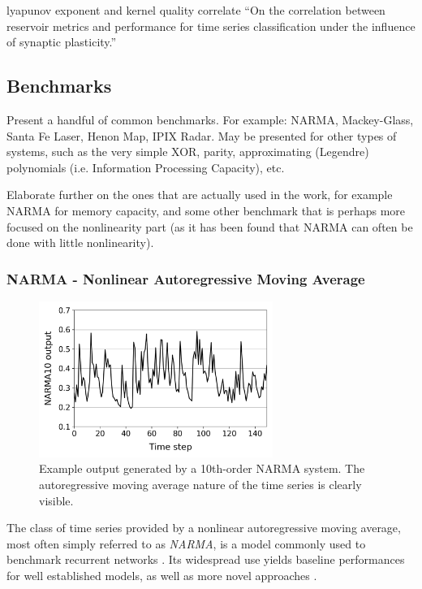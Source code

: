 lyapunov exponent and kernel quality correlate ``On the correlation between
reservoir metrics and performance for time series classification under the
influence of synaptic plasticity.''

\subsection{Benchmarks}

Present a handful of common benchmarks. For example: NARMA, Mackey-Glass, Santa
Fe Laser, Henon Map, IPIX Radar. May be presented for other types of systems,
such as the very simple XOR, parity, approximating (Legendre) polynomials
(i.e. Information Processing Capacity), etc.

Elaborate further on the ones that are actually used in the work, for example
NARMA for memory capacity, and some other benchmark that is perhaps more focused
on the nonlinearity part (as it has been found that NARMA can often be done with
little nonlinearity).

\subsubsection{NARMA - Nonlinear Autoregressive Moving Average}

\begin{figure}[t!]
  \centering
  \includegraphics[width=3.0in]{figures/NARMA10.png}
  \caption{
    Example output generated by a 10th-order NARMA system. The autoregressive
moving average nature of the time series is clearly visible.
  }
  \label{narma10-fig}
\end{figure}

The class of time series provided by a nonlinear autoregressive moving average,
most often simply referred to as \textit{NARMA}, is a model commonly used to
benchmark recurrent networks \cite{atiya_new_2000}. Its widespread use yields
baseline performances for well established models, as well as more novel
approaches \cite{verstraeten_experimental_2007, appeltant_information_2011}.

